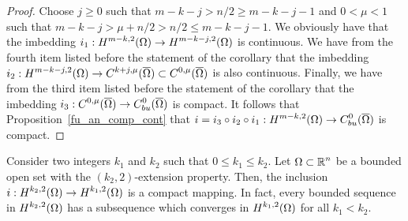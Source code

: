 \begin{proof}
 Choose $j \geq 0$ such that $m-k -j >n/2 \geq m-k-j-1$ and
$0<\mu<1$ such that $m-k -j > \mu + n/2 > n/2 \leq m-k-j-1$.
We obviously have that the imbedding
$\displaystyle i_1 : H^{m-k,2}(\Omega) \to H^{m-k-j,2}(\Omega)$
is continuous.  We have from the fourth item listed before the
statement of the corollary that the imbedding
$\displaystyle i_2 : H^{m-k-j,2}(\Omega) \to
C^{k+j,\mu}(\overline{\Omega}) \subset C^{0,\mu}(\overline{\Omega})$
is also continuous.  Finally, we have from the third item 
listed before the statement of the corollary that the imbedding
$\displaystyle i_3 : C^{0,\mu}(\overline{\Omega})
\to C_{bu}^0(\overline{\Omega})$ is
compact.  It follows that Proposition~\ref{fu_an_comp_cont} that
$\displaystyle i = i_3 \circ i_2 \circ i_1:
H^{m-k,2}(\Omega) \to C^0_{bu}(\overline{\Omega})$ is
compact.
\end{proof}

\begin{theorem} \label{sob_rell_th}
Consider two integers $k_1$ and $k_2$ such that $0\leq k_1\leq k_2$.
Let $\displaystyle \Omega \subset \mathbb{R}^n$ be a bounded open set with the
$(k_2,2)$-extension property.  Then, the inclusion
$\displaystyle i:H^{k_2,2}(\Omega) \to H^{k_1,2}(\Omega)$ is a
compact mapping.  In fact, every bounded sequence in
$\displaystyle H^{k_2,2}(\Omega)$ has a subsequence which converges in
$\displaystyle H^{k_1,2}(\Omega)$ for all $k_1 < k_2$.
\end{theorem}

